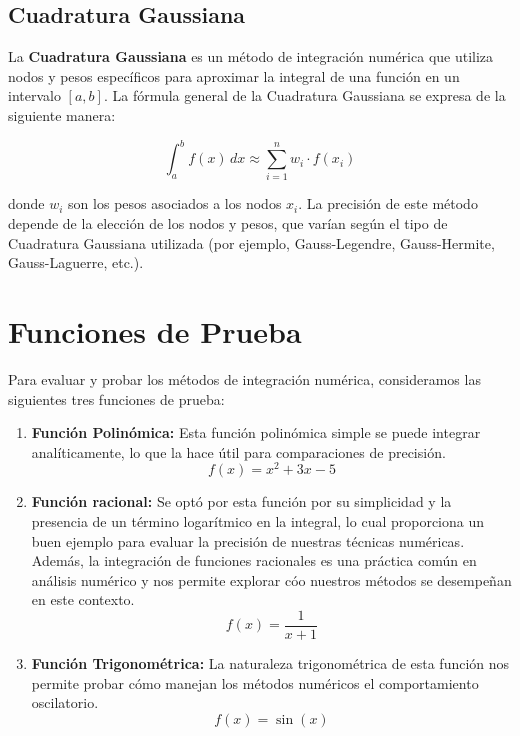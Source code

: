 \documentclass[a4paper]{article}
\begin{document}
    \subsection{Cuadratura Gaussiana}
    
    La \textbf{Cuadratura Gaussiana} es un método de integración numérica que utiliza nodos y pesos 
    específicos para aproximar la integral de una función en un intervalo $[a, b]$. La fórmula 
    general de la Cuadratura Gaussiana se expresa de la siguiente manera:
    
    \[
    \int_{a}^{b} f(x) \, dx \approx \sum_{i=1}^{n} w_i \cdot f(x_i)
    \]
    
    donde $w_i$ son los pesos asociados a los nodos $x_i$. La precisión de este método depende de 
    la elección de los nodos y pesos, que varían según el tipo de Cuadratura Gaussiana utilizada 
    (por ejemplo, Gauss-Legendre, Gauss-Hermite, Gauss-Laguerre, etc.). 
    \cite{smythnumerical}

    \section{Funciones de Prueba}
	\label{sec:funciones}
    Para evaluar y probar los métodos de integración numérica, consideramos las siguientes tres 	
    funciones de prueba:

    \begin{enumerate}
    
      \item \textbf{Función Polinómica:}
       Esta función polinómica simple se puede integrar analíticamente, lo que la hace útil para 
       comparaciones de precisión.
      \begin{equation}
      f(x) = x^2 + 3x - 5
      \end{equation}
    
      \item \textbf{Función racional:}
       Se optó por esta función por su simplicidad y la presencia de un término logarítmico en la 	
       integral, lo cual proporciona un buen ejemplo para evaluar la precisión de nuestras técnicas 
       numéricas. Además, la integración de funciones racionales es una práctica común en análisis 
       numérico y nos permite explorar cóo nuestros métodos se desempeñan en este contexto.
      \begin{equation}
      f(x) = \frac{1}{x + 1}
      \end{equation}

       \item \textbf{Función Trigonométrica:}
       La naturaleza trigonométrica de esta función nos permite probar cómo manejan los métodos
       numéricos el comportamiento oscilatorio.
      \begin{equation}
      f(x) = \sin(x)
      \end{equation}
    
    \end{enumerate}
\end{document}
